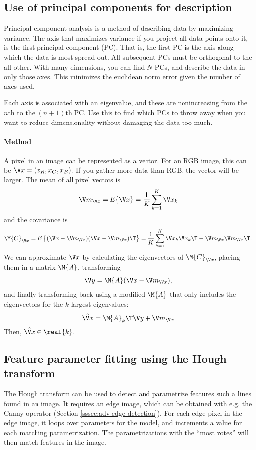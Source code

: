 \subsection[Principal components]{Use of principal components for description}
Principal component analysis is a method of describing data by maximizing variance. The axis that maximizes variance if you project all data points onto it, is the first principal component (PC). That is, the first PC is the axis along which the data is most spread out. All subsequent PCs must be orthogonal to the all other. With many dimensions, you can find $N$ PCs, and describe the data in only those axes. This minimizes the euclidean norm error given the number of axes used.

Each axis is associated with an eigenvalue, and these are nonincreasing from the $n$th to the $(n+1)$th PC. Use this to find which PCs to throw away when you want to reduce dimensionality without damaging the data too much.

\paragraph{Method}
A pixel in an image can be represented as a vector. For an RGB image, this can be $\x = (x_R, x_G, x_B)$. If you gather more data than RGB, the vector will be larger. The mean of all pixel vectors is
\begin{equation}
    \m_{\x} = E\{ \x \} = \frac{1}{K} \sum_{k=1}^K \x_k
\end{equation}
and the covariance is
\begin{equation}
    \M{C}_{\x} = E\left\{ (\x - \m_{\x})(\x - \m_{\x})\T \right\} = \frac{1}{K} \sum_{k=1}^K \x_k \x_k\T - \m_{\x} \m_{\x}\T.
\end{equation}
We can approximate $\x$ by calculating the eigenvectors of $\M{C}_{\x}$, placing them in a matrix $\M{A}$, transforming
\begin{equation}
    \y = \M{A}(\x - \m_{\x}),
\end{equation}
and finally transforming back using a modified $\M{A}$ that only includes the eigenvectors for the $k$ largest eigenvalues:
\begin{equation}
    \hat\x = \M{A}_k\T \y + \m_{\x}
\end{equation}
Then, $\hat\x \in \real{k}$.

\subsection{Feature parameter fitting using the Hough transform}
The Hough transform can be used to detect and parametrize features such a lines found in an image. It requires an edge image, which can be obtained with e.g. the Canny operator (Section \ref{sssec:adv-edge-detection}). For each edge pixel in the edge image, it loops over parameters for the model, and increments a value for each matching parametrization. The parametrizations with the ``most votes'' will then match features in the image.


